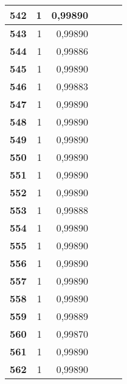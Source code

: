 \begin{longtable}{|r|r|r|l|r|r|}
\textbf{542} & 1 & 0,99890 &  & \multicolumn{1}{l|}{} & \multicolumn{1}{l|}{} \\ \hline
\textbf{543} & 1 & 0,99890 &  & \multicolumn{1}{l|}{} & \multicolumn{1}{l|}{} \\ \hline
\textbf{544} & 1 & 0,99886 &  & \multicolumn{1}{l|}{} & \multicolumn{1}{l|}{} \\ \hline
\textbf{545} & 1 & 0,99890 &  & \multicolumn{1}{l|}{} & \multicolumn{1}{l|}{} \\ \hline
\textbf{546} & 1 & 0,99883 &  & \multicolumn{1}{l|}{} & \multicolumn{1}{l|}{} \\ \hline
\textbf{547} & 1 & 0,99890 &  & \multicolumn{1}{l|}{} & \multicolumn{1}{l|}{} \\ \hline
\textbf{548} & 1 & 0,99890 &  & \multicolumn{1}{l|}{} & \multicolumn{1}{l|}{} \\ \hline
\textbf{549} & 1 & 0,99890 &  & \multicolumn{1}{l|}{} & \multicolumn{1}{l|}{} \\ \hline
\textbf{550} & 1 & 0,99890 &  & \multicolumn{1}{l|}{} & \multicolumn{1}{l|}{} \\ \hline
\textbf{551} & 1 & 0,99890 &  & \multicolumn{1}{l|}{} & \multicolumn{1}{l|}{} \\ \hline
\textbf{552} & 1 & 0,99890 &  & \multicolumn{1}{l|}{} & \multicolumn{1}{l|}{} \\ \hline
\textbf{553} & 1 & 0,99888 &  & \multicolumn{1}{l|}{} & \multicolumn{1}{l|}{} \\ \hline
\textbf{554} & 1 & 0,99890 &  & \multicolumn{1}{l|}{} & \multicolumn{1}{l|}{} \\ \hline
\textbf{555} & 1 & 0,99890 &  & \multicolumn{1}{l|}{} & \multicolumn{1}{l|}{} \\ \hline
\textbf{556} & 1 & 0,99890 &  & \multicolumn{1}{l|}{} & \multicolumn{1}{l|}{} \\ \hline
\textbf{557} & 1 & 0,99890 &  & \multicolumn{1}{l|}{} & \multicolumn{1}{l|}{} \\ \hline
\textbf{558} & 1 & 0,99890 &  & \multicolumn{1}{l|}{} & \multicolumn{1}{l|}{} \\ \hline
\textbf{559} & 1 & 0,99889 &  & \multicolumn{1}{l|}{} & \multicolumn{1}{l|}{} \\ \hline
\textbf{560} & 1 & 0,99870 &  & \multicolumn{1}{l|}{} & \multicolumn{1}{l|}{} \\ \hline
\textbf{561} & 1 & 0,99890 &  & \multicolumn{1}{l|}{} & \multicolumn{1}{l|}{} \\ \hline
\textbf{562} & 1 & 0,99890 &  & \multicolumn{1}{l|}{} & \multicolumn{1}{l|}{} \\ \hline

\end{longtable}
